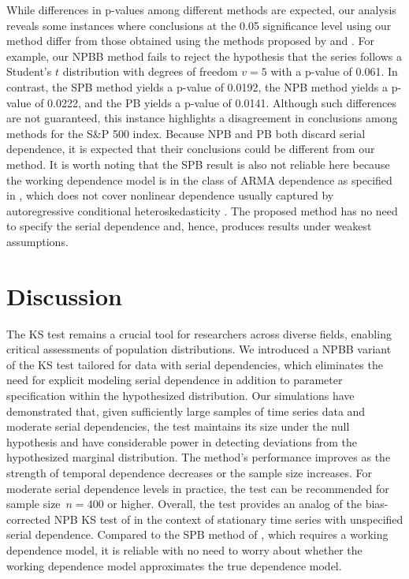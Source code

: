 \documentclass[12pt]{article}
\begin{document}
While differences in p-values among different methods are expected, our analysis
reveals some instances where conclusions at the 0.05 significance level
using our method differ from those obtained using the methods proposed by
\citet{babu2004goodness} and \citet{zeimbekakis2024misuses}.
For example, our NPBB method fails to reject the
hypothesis that the series follows a Student's $t$ distribution with degrees of
freedom $v = 5$ with a p-value of 0.061. In contrast,
the SPB method yields a p-value of 0.0192,
the NPB method yields a p-value of 0.0222, and the PB yields a p-value of
0.0141. Although such differences are not guaranteed, this
instance highlights a disagreement in conclusions among methods for the S\&P 500
index. Because NPB and PB both discard serial dependence, it is expected that
their conclusions could be different from our method. It is worth noting that
the SPB result is also not reliable here because the working dependence model is
in the class of ARMA dependence as specified in \citet{zeimbekakis2024misuses},
which does not cover nonlinear dependence usually captured by autoregressive
conditional heteroskedasticity \citep{engle1995arch}. The proposed method has
no need to specify the serial dependence and, hence, produces results under
weakest assumptions.

\section{Discussion}\label{sec:conclusion}

The KS test remains a crucial tool for researchers across diverse fields,
enabling critical assessments of population distributions. We introduced a
NPBB variant of the KS test tailored for data with
serial dependencies, which eliminates the need for explicit modeling serial
dependence in addition to parameter specification within the hypothesized
distribution. Our simulations have demonstrated that, given
sufficiently large samples of time series data and moderate serial dependencies,
the test maintains its size under the null hypothesis and have considerable
power in detecting deviations from the hypothesized marginal distribution. The
method's performance improves as the strength of temporal dependence decreases
or the sample size increases. For moderate serial dependence levels in practice,
the test can be recommended for sample size~$n = 400$ or higher.
Overall, the test provides an analog of the bias-corrected NPB KS test of
\citet{babu2004goodness} in the context of stationary time
series with unspecified serial dependence. Compared to the SPB method
of \citet{zeimbekakis2024misuses}, which requires a working dependence model, it
is reliable with no need to worry about whether the working dependence
model approximates the true dependence model.
\end{document}
